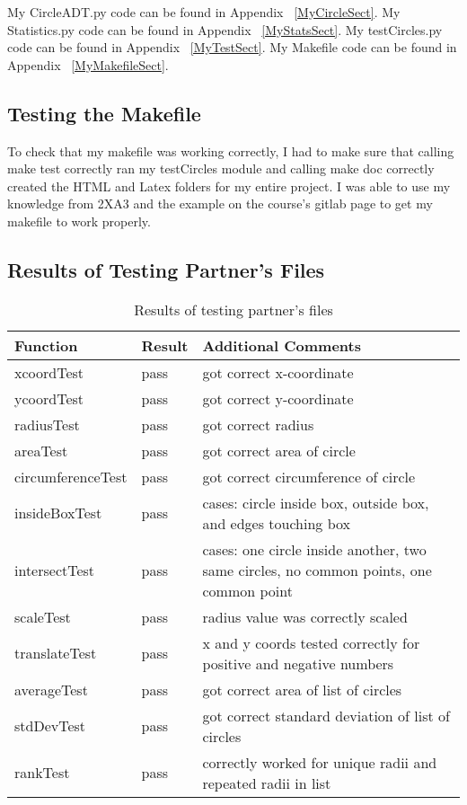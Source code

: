 \documentclass[12pt]{article}
\begin{document}
\noindent 
My CircleADT.py code can be found in Appendix ~\ref{MyCircleSect}. \newline
My Statistics.py code can be found in Appendix ~\ref{MyStatsSect}. \newline
My testCircles.py code can be found in Appendix ~\ref{MyTestSect}.\newline
My Makefile code can be found in Appendix ~\ref{MyMakefileSect}.


\subsection{Testing the Makefile}

To check that my makefile was working correctly, I had to make sure that calling make test correctly ran my testCircles module and calling make doc correctly created the HTML and Latex folders for my entire project. I was able to use my knowledge from 2XA3 and the example on the course's gitlab page to get my makefile to work properly.


\subsection{Results of Testing Partner's Files}

\begin{table}[h]
	\centering
	\begin{tabularx}{\linewidth}{ l|l|X }
		\toprule
		Function & Result & Additional Comments\\
		\midrule
		xcoordTest & pass & got correct x-coordinate\\
		ycoordTest & pass & got correct y-coordinate\\
		radiusTest & pass & got correct radius\\
		areaTest & pass & got correct area of circle\\
		circumferenceTest & pass & got correct circumference of circle\\
		insideBoxTest & pass & cases: circle inside box, outside box, and edges touching box\\
		intersectTest & pass & cases: one circle inside another, two same circles, no common points, one common point\\
		scaleTest & pass & radius value was correctly scaled\\
		translateTest & pass &  x and y coords tested correctly for positive and negative numbers\\
		averageTest & pass & got correct area of list of circles\\
		stdDevTest & pass & got correct standard deviation of list of circles\\
		rankTest & pass & correctly worked for unique radii and repeated radii in list\\
		\bottomrule
	\end{tabularx}
	\caption{Results of testing partner's files}
	\label{Table : Results of partner's files}
\end{table}
\end{document}
